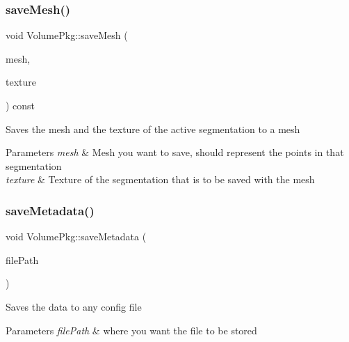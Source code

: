 \subsubsection{\texorpdfstring{save\+Mesh()}{saveMesh()}\hspace{0.1cm}{\footnotesize\ttfamily [2/2]}}
{\footnotesize\ttfamily void Volume\+Pkg\+::save\+Mesh (\begin{DoxyParamCaption}\item[{const volcart\+::\+I\+T\+K\+Mesh\+::\+Pointer}]{mesh,  }\item[{const volcart\+::\+Texture \&}]{texture }\end{DoxyParamCaption}) const}

Saves the mesh and the texture of the active segmentation to a mesh 
\begin{DoxyParams}{Parameters}
{\em mesh} & Mesh you want to save, should represent the points in that segmentation \\
\hline
{\em texture} & Texture of the segmentation that is to be saved with the mesh \\
\hline
\end{DoxyParams}
\hypertarget{classVolumePkg_abdccc4c348d57a7ea84a65c48ee50c75}{}\label{classVolumePkg_abdccc4c348d57a7ea84a65c48ee50c75} 
\subsubsection{\texorpdfstring{save\+Metadata()}{saveMetadata()}\hspace{0.1cm}{\footnotesize\ttfamily [1/2]}}
{\footnotesize\ttfamily void Volume\+Pkg\+::save\+Metadata (\begin{DoxyParamCaption}\item[{const boost\+::filesystem\+::path \&}]{file\+Path }\end{DoxyParamCaption})}

Saves the data to any config file 
\begin{DoxyParams}{Parameters}
{\em file\+Path} & where you want the file to be stored \\
\hline
\end{DoxyParams}
\hypertarget{classVolumePkg_a49a81e85ddb0fb188efdeb357592b99f}{}\label{classVolumePkg_a49a81e85ddb0fb188efdeb357592b99f} 
